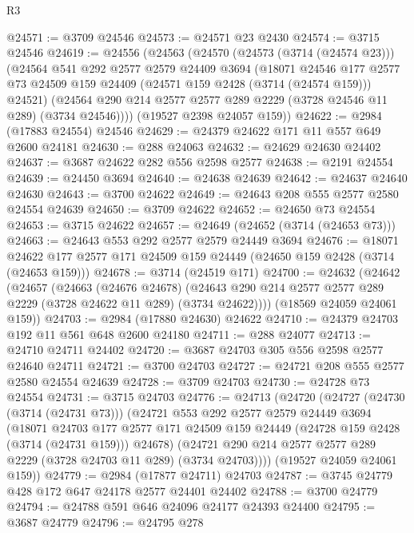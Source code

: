 \begin{lexlean}{R3}
\begin{coremodule}
@24571 := @3709 @24546
@24573 := @24571 @23 @2430
@24574 := @3715 @24546
@24619 := @24556
    (@24563
      (@24570
        (@24573 (@3714 (@24574 @23)))
        (@24564
          @541
          @292
          @2577
          @2579
          @24409
          @3694
          (@18071
            @24546
            @177
            @2577
            @73
            @24509
            @159
            @24409
            (@24571 @159 @2428 (@3714 (@24574 @159)))
            @24521)
          (@24564 @290 @214 @2577 @2577 @289 @2229 (@3728 @24546 @11 @289) (@3734 @24546))))
      (@19527 @2398 @24057 @159))
@24622 := @2984 (@17883 @24554) @24546
@24629 := @24379 @24622 @171 @11 @557 @649 @2600 @24181
@24630 := @288 @24063
@24632 := @24629 @24630 @24402
@24637 := @3687 @24622 @282 @556 @2598 @2577
@24638 := @2191 @24554
@24639 := @24450 @3694
@24640 := @24638 @24639
@24642 := @24637 @24640 @24630
@24643 := @3700 @24622
@24649 := @24643 @208 @555 @2577 @2580 @24554 @24639
@24650 := @3709 @24622
@24652 := @24650 @73 @24554
@24653 := @3715 @24622
@24657 := @24649 (@24652 (@3714 (@24653 @73)))
@24663 := @24643 @553 @292 @2577 @2579 @24449 @3694
@24676 := @18071 @24622 @177 @2577 @171 @24509 @159 @24449 (@24650 @159 @2428 (@3714 (@24653 @159)))
@24678 := @3714 (@24519 @171)
@24700 := @24632
    (@24642
      (@24657
        (@24663
          (@24676 @24678)
          (@24643 @290 @214 @2577 @2577 @289 @2229 (@3728 @24622 @11 @289) (@3734 @24622))))
      (@18569 @24059 @24061 @159))
@24703 := @2984 (@17880 @24630) @24622
@24710 := @24379 @24703 @192 @11 @561 @648 @2600 @24180
@24711 := @288 @24077
@24713 := @24710 @24711 @24402
@24720 := @3687 @24703 @305 @556 @2598 @2577 @24640 @24711
@24721 := @3700 @24703
@24727 := @24721 @208 @555 @2577 @2580 @24554 @24639
@24728 := @3709 @24703
@24730 := @24728 @73 @24554
@24731 := @3715 @24703
@24776 := @24713
    (@24720
      (@24727
        (@24730 (@3714 (@24731 @73)))
        (@24721
          @553
          @292
          @2577
          @2579
          @24449
          @3694
          (@18071
            @24703
            @177
            @2577
            @171
            @24509
            @159
            @24449
            (@24728 @159 @2428 (@3714 (@24731 @159)))
            @24678)
          (@24721 @290 @214 @2577 @2577 @289 @2229 (@3728 @24703 @11 @289) (@3734 @24703))))
      (@19527 @24059 @24061 @159))
@24779 := @2984 (@17877 @24711) @24703
@24787 := @3745 @24779 @428 @172 @647 @24178 @2577 @24401 @24402
@24788 := @3700 @24779
@24794 := @24788 @591 @646 @24096 @24177 @24393 @24400
@24795 := @3687 @24779
@24796 := @24795 @278

\end{coremodule}
\end{lexlean}
